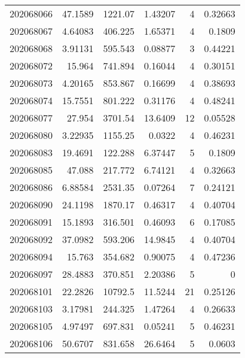 \begin{tabular}{rrrrrr}
 202068066 &         47.1589  &     1221.07   &            1.43207 &           4 & 0.32663 \\
 202068067 &          4.64083 &      406.225  &            1.65371 &           4 & 0.1809  \\
 202068068 &          3.91131 &      595.543  &            0.08877 &           3 & 0.44221 \\
 202068072 &         15.964   &      741.894  &            0.16044 &           4 & 0.30151 \\
 202068073 &          4.20165 &      853.867  &            0.16699 &           4 & 0.38693 \\
 202068074 &         15.7551  &      801.222  &            0.31176 &           4 & 0.48241 \\
 202068077 &         27.954   &     3701.54   &           13.6409  &          12 & 0.05528 \\
 202068080 &          3.22935 &     1155.25   &            0.0322  &           4 & 0.46231 \\
 202068083 &         19.4691  &      122.288  &            6.37447 &           5 & 0.1809  \\
 202068085 &         47.088   &      217.772  &            6.74121 &           4 & 0.32663 \\
 202068086 &          6.88584 &     2531.35   &            0.07264 &           7 & 0.24121 \\
 202068090 &         24.1198  &     1870.17   &            0.46317 &           4 & 0.40704 \\
 202068091 &         15.1893  &      316.501  &            0.46093 &           6 & 0.17085 \\
 202068092 &         37.0982  &      593.206  &           14.9845  &           4 & 0.40704 \\
 202068094 &         15.763   &      354.682  &            0.90075 &           4 & 0.47236 \\
 202068097 &         28.4883  &      370.851  &            2.20386 &           5 & 0       \\
 202068101 &         22.2826  &    10792.5    &           11.5244  &          21 & 0.25126 \\
 202068103 &          3.17981 &      244.325  &            1.47264 &           4 & 0.26633 \\
 202068105 &          4.97497 &      697.831  &            0.05241 &           5 & 0.46231 \\
 202068106 &         50.6707  &      831.658  &           26.6464  &           5 & 0.0603  \\

\end{tabular}
